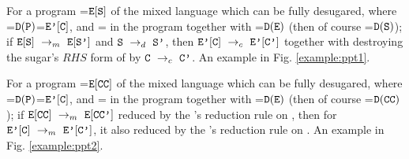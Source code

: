 \begin{property} \label{thm1} 
	For a program =$\mbox{\tt E}[\mbox{\tt S}]$ of the mixed language which can be fully desugared, where =$\mathtt{D}(\mbox{\tt P})$=$\mbox{\tt E'}[\mbox{\tt C}]$, and = in the program  together with =$\mathtt{D}(\mbox{\tt E})$ (then of course =$\mathtt{D}(\mbox{\tt S})$); if $\mbox{\tt E}[\mbox{\tt S}] ~\rightarrow_m~\mbox{\tt E}[\mbox{\tt S'}]$ and $\mbox{\tt S} ~\rightarrow_d~ \mbox{\tt S'}$, then $\mbox{\tt E'}[\mbox{\tt C}] ~\rightarrow_c~\mbox{\tt E'}[\mbox{\tt C'}]$ together with destroying the sugar's $RHS$ form of  by $\mbox{\tt C} ~\rightarrow_c~\mbox{\tt C'}$. An example in Fig. \ref{example:ppt1}.
\end{property}

\begin{property} \label{thm2} 
	For a program =$\mbox{\tt E}[\mbox{\tt CC}]$ of the mixed language which can be fully desugared, where =$\mathtt{D}(\mbox{\tt P})$=$\mbox{\tt E'}[\mbox{\tt C}]$, and = in the program  together with =$\mathtt{D}(\mbox{\tt E})$ (then of course =$\mathtt{D}(\mbox{\tt CC})$); if $\mbox{\tt E}[\mbox{\tt CC}] ~\rightarrow_m~\mbox{\tt E}[\mbox{\tt CC'}]$ reduced by the 's reduction rule on , then for $\mbox{\tt E'}[\mbox{\tt C}] ~\rightarrow_m~\mbox{\tt E'}[\mbox{\tt C'}]$, it also reduced by the 's reduction rule on . An example in Fig. \ref{example:ppt2}.
\end{property}

